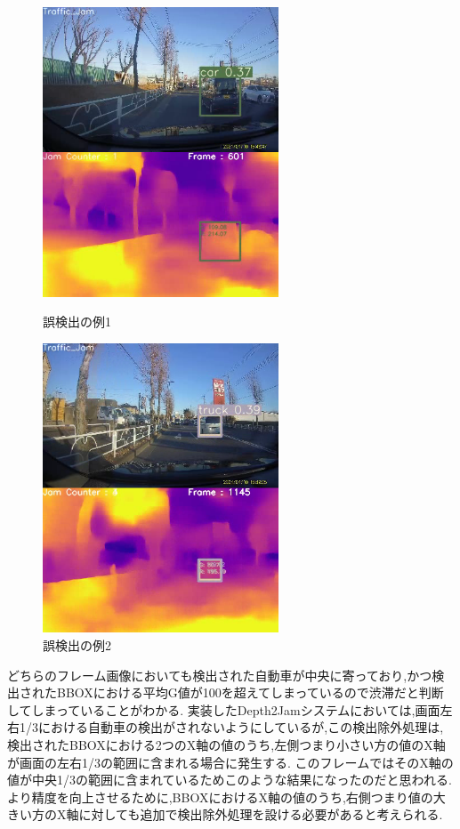 \begin{figure}[htbp]
  \begin{minipage}{0.5\hsize}
   \begin{center}
    \includegraphics[width=7cm]{figs/mov2miss/miss01.png}
   \end{center}
   \caption{誤検出の例1}
   \label{fig:mov2miss01}
  \end{minipage}
  \begin{minipage}{0.5\hsize}
  \begin{center}
   \includegraphics[width=7cm]{figs/mov2miss/miss02.png}
  \end{center}
   \caption{誤検出の例2}
   \label{fig:mov2miss02}
  \end{minipage}
 \end{figure}

どちらのフレーム画像においても検出された自動車が中央に寄っており,かつ検出されたBBOXにおける平均G値が100を超えてしまっているので渋滞だと判断してしまっていることがわかる.
実装したDepth2Jamシステムにおいては,画面左右1/3における自動車の検出がされないようにしているが,この検出除外処理は,検出されたBBOXにおける2つのX軸の値のうち,左側つまり小さい方の値のX軸が画面の左右1/3の範囲に含まれる場合に発生する.
このフレームではそのX軸の値が中央1/3の範囲に含まれているためこのような結果になったのだと思われる.
より精度を向上させるために,BBOXにおけるX軸の値のうち,右側つまり値の大きい方のX軸に対しても追加で検出除外処理を設ける必要があると考えられる.

